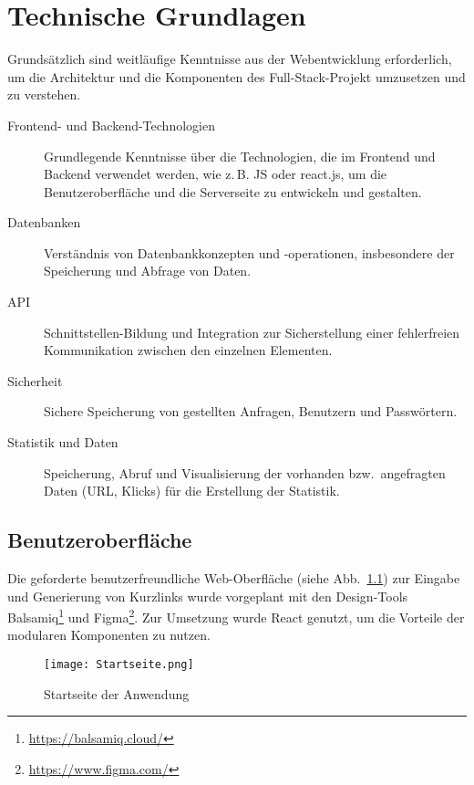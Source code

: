 \documentclass[a4paper,11pt,DIV=12]{scrreprt}%
\begin{document}
\chapter{Technische Grundlagen}
Grundsätzlich sind weitläufige Kenntnisse aus der Webentwicklung erforderlich, um die Architektur und die Komponenten des Full-Stack-Projekt umzusetzen und zu verstehen.

\begin{description}
    \item[Frontend- und Backend-Technologien] Grundlegende Kenntnisse über die Technologien, die im Frontend und Backend verwendet werden, wie z.\,B. \ac{JS} oder \mbox{react.js}, um die Benutzeroberfläche und die Serverseite zu entwickeln und gestalten.

    \item[Datenbanken] Verständnis von Datenbankkonzepten und -operationen, insbesondere der Speicherung und Abfrage von Daten.

    \item[API] Schnittstellen-Bildung und Integration zur Sicherstellung einer fehlerfreien Kommunikation zwischen den einzelnen Elementen.

    \item[Sicherheit] Sichere Speicherung von gestellten Anfragen, Benutzern und Passwörtern.

    \item[Statistik und Daten] Speicherung, Abruf und Visualisierung der vorhanden bzw.\ angefragten Daten (\ac{URL}, Klicks) für die Erstellung der Statistik.
\end{description}

\section{Benutzeroberfläche}
Die geforderte benutzerfreundliche Web-Oberfläche (siehe Abb.~\ref{fig:Startseite}) zur Eingabe und Generierung von Kurzlinks wurde vorgeplant mit den Design-Tools Balsamiq\footnote{\href{https://balsamiq.cloud/}{https://balsamiq.cloud/}} und Figma\footnote{\href{https://www.figma.com/}{https://www.figma.com/}}. Zur Umsetzung wurde React genutzt, um die Vorteile der modularen Komponenten zu nutzen.

\begin{figure}[h]%
    \begin{small}%
        \begin{center}%
            \texttt{[image: Startseite.png]}%
        \end{center}%
        \caption{Startseite der Anwendung}%
        \label{fig:Startseite}%
    \end{small}%
\end{figure}%
\end{document}
